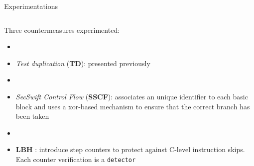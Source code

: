 \begin{frame}{Experimentations}
\begin{tiny}
\begin{columns}
            \begin{column}{0.5\textwidth}
                 Three countermeasures experimented:
                 \begin{itemize}
                     \item[]
                     \item \textit{Test duplication} (\textbf{TD}): presented previously
                     \item[]
                     \item \textit{SecSwift Control Flow} (\textbf{SSCF})\cite{Ferriere/LLVM19}: associates an unique identifier to each basic block and uses a xor-based mechanism to ensure that the correct branch has been taken
                     \item[]
                     \item \textbf{LBH} \cite{Lalande/ESORICS14}: introduce step counters to protect against C-level instruction skips. Each counter verification is a \texttt{detector}
                 \end{itemize}
            \end{column}
        \end{columns}
    \end{tiny}
\end{frame}
